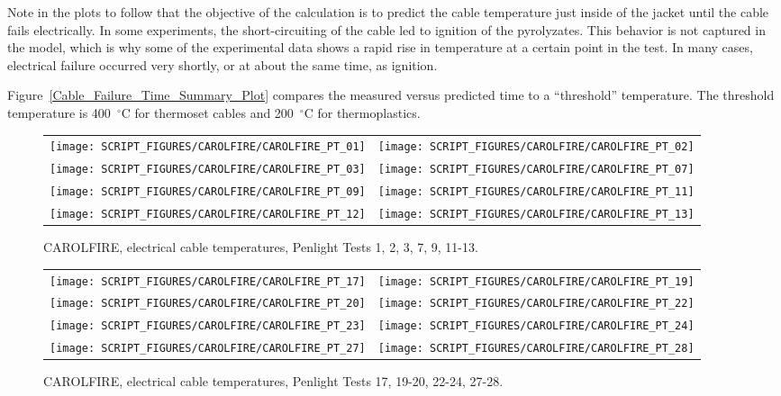 Note in the plots to follow that the objective of the calculation is to predict the cable temperature just inside of the jacket until the cable fails electrically. In some experiments, the short-circuiting of the cable led to ignition of the pyrolyzates. This behavior is not captured in the model, which is why some of the experimental data shows a rapid rise in temperature at a certain point in the test. In many cases, electrical failure occurred very shortly, or at about the same time, as ignition.

Figure~\ref{Cable_Failure_Time_Summary_Plot} compares the measured versus predicted time to a ``threshold'' temperature. The threshold temperature is 400~$^\circ$C for thermoset cables and 200~$^\circ$C for thermoplastics.

\newpage

\begin{figure}[p]
\begin{tabular*}{\textwidth}{l@{\extracolsep{\fill}}r}
\texttt{[image: SCRIPT\_FIGURES/CAROLFIRE/CAROLFIRE\_PT\_01]} &
\texttt{[image: SCRIPT\_FIGURES/CAROLFIRE/CAROLFIRE\_PT\_02]} \\
\texttt{[image: SCRIPT\_FIGURES/CAROLFIRE/CAROLFIRE\_PT\_03]} &
\texttt{[image: SCRIPT\_FIGURES/CAROLFIRE/CAROLFIRE\_PT\_07]} \\
\texttt{[image: SCRIPT\_FIGURES/CAROLFIRE/CAROLFIRE\_PT\_09]} &
\texttt{[image: SCRIPT\_FIGURES/CAROLFIRE/CAROLFIRE\_PT\_11]} \\
\texttt{[image: SCRIPT\_FIGURES/CAROLFIRE/CAROLFIRE\_PT\_12]} &
\texttt{[image: SCRIPT\_FIGURES/CAROLFIRE/CAROLFIRE\_PT\_13]}
\end{tabular*}
\caption[CAROLFIRE, electrical cable temperatures, Penlight Tests 1, 2, 3, 7, 9, 11-13]{CAROLFIRE, electrical cable temperatures, Penlight Tests 1, 2, 3, 7, 9, 11-13.}
\label{CAROLFIRE_Thermoset_1}
\end{figure}

\begin{figure}[p]
\begin{tabular*}{\textwidth}{l@{\extracolsep{\fill}}r}
\texttt{[image: SCRIPT\_FIGURES/CAROLFIRE/CAROLFIRE\_PT\_17]} &
\texttt{[image: SCRIPT\_FIGURES/CAROLFIRE/CAROLFIRE\_PT\_19]} \\
\texttt{[image: SCRIPT\_FIGURES/CAROLFIRE/CAROLFIRE\_PT\_20]} &
\texttt{[image: SCRIPT\_FIGURES/CAROLFIRE/CAROLFIRE\_PT\_22]} \\
\texttt{[image: SCRIPT\_FIGURES/CAROLFIRE/CAROLFIRE\_PT\_23]} &
\texttt{[image: SCRIPT\_FIGURES/CAROLFIRE/CAROLFIRE\_PT\_24]} \\
\texttt{[image: SCRIPT\_FIGURES/CAROLFIRE/CAROLFIRE\_PT\_27]} &
\texttt{[image: SCRIPT\_FIGURES/CAROLFIRE/CAROLFIRE\_PT\_28]}
\end{tabular*}
\caption[CAROLFIRE, electrical cable temperatures, Penlight Tests 17, 19-20, 22-24, 27-28]{CAROLFIRE, electrical cable temperatures, Penlight Tests 17, 19-20, 22-24, 27-28.}
\label{CAROLFIRE_Thermoset_2}
\end{figure}

